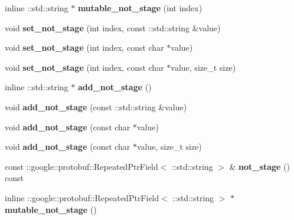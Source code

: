 \begin{DoxyCompactItemize}
inline \+::std\+::string $\ast$ {\bfseries mutable\+\_\+not\+\_\+stage} (int index)
\item 
\mbox{\label{classcaffe_1_1_net_state_rule_a82ca92331a3f2cc0ea823a0a589a369c}} 
void {\bfseries set\+\_\+not\+\_\+stage} (int index, const \+::std\+::string \&value)
\item 
\mbox{\label{classcaffe_1_1_net_state_rule_aaf58f6e46077be52db99befc73963220}} 
void {\bfseries set\+\_\+not\+\_\+stage} (int index, const char $\ast$value)
\item 
\mbox{\label{classcaffe_1_1_net_state_rule_abf93f86278d842f10b655ade642be444}} 
void {\bfseries set\+\_\+not\+\_\+stage} (int index, const char $\ast$value, size\+\_\+t size)
\item 
\mbox{\label{classcaffe_1_1_net_state_rule_a63a55aba255e5d2cd53b15ee260e3f58}} 
inline \+::std\+::string $\ast$ {\bfseries add\+\_\+not\+\_\+stage} ()
\item 
\mbox{\label{classcaffe_1_1_net_state_rule_a8c5d308a4c7426e063d6a7fa3e7c4844}} 
void {\bfseries add\+\_\+not\+\_\+stage} (const \+::std\+::string \&value)
\item 
\mbox{\label{classcaffe_1_1_net_state_rule_a8b5417f55be52a112f2674812d5448af}} 
void {\bfseries add\+\_\+not\+\_\+stage} (const char $\ast$value)
\item 
\mbox{\label{classcaffe_1_1_net_state_rule_a9e4abe1478c0663fa3f5b61bbace6157}} 
void {\bfseries add\+\_\+not\+\_\+stage} (const char $\ast$value, size\+\_\+t size)
\item 
\mbox{\label{classcaffe_1_1_net_state_rule_ab01129eb44fff27cb8fb4a502363e246}} 
const \+::google\+::protobuf\+::\+Repeated\+Ptr\+Field$<$ \+::std\+::string $>$ \& {\bfseries not\+\_\+stage} () const
\item 
\mbox{\label{classcaffe_1_1_net_state_rule_ad8b5c0407847b56a4a33144ce59a3783}} 
inline \+::google\+::protobuf\+::\+Repeated\+Ptr\+Field$<$ \+::std\+::string $>$ $\ast$ {\bfseries mutable\+\_\+not\+\_\+stage} ()
\end{DoxyCompactItemize}
